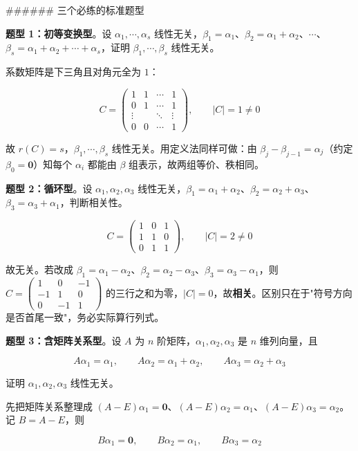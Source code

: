 \documentclass[11pt,openany,UTF8]{ctexbook}
\begin{document}
\#\#\#\#\#\# 三个必练的标准题型

\textbf{题型 1：初等变换型}。设 $\alpha_1,\cdots,\alpha_s$ 线性无关，$\beta_1=\alpha_1$、$\beta_2=\alpha_1+\alpha_2$、$\cdots$、$\beta_s=\alpha_1+\alpha_2+\cdots+\alpha_s$，证明 $\beta_1,\cdots,\beta_s$ 线性无关。

系数矩阵是下三角且对角元全为 $1$：

\[C=\begin{pmatrix} 1 & 1 & \cdots & 1 \\ 0 & 1 & \cdots & 1 \\ \vdots & & \ddots & \vdots \\ 0 & 0 & \cdots & 1 \end{pmatrix},\qquad \vert C\vert=1\ne0\]

故 $r(C)=s$，$\beta_1,\cdots,\beta_s$ 线性无关。用定义法同样可做：由 $\beta_j-\beta_{j-1}=\alpha_j$（约定 $\beta_0=\mathbf{0}$）知每个 $\alpha_i$ 都能由 $\beta$ 组表示，故两组等价、秩相同。

\textbf{题型 2：循环型}。设 $\alpha_1,\alpha_2,\alpha_3$ 线性无关，$\beta_1=\alpha_1+\alpha_2$、$\beta_2=\alpha_2+\alpha_3$、$\beta_3=\alpha_3+\alpha_1$，判断相关性。

\[C=\begin{pmatrix} 1 & 0 & 1 \\ 1 & 1 & 0 \\ 0 & 1 & 1 \end{pmatrix},\qquad \vert C\vert=2\ne0\]

故无关。若改成 $\beta_1=\alpha_1-\alpha_2$、$\beta_2=\alpha_2-\alpha_3$、$\beta_3=\alpha_3-\alpha_1$，则 $C=\begin{pmatrix} 1 & 0 & -1 \\ -1 & 1 & 0 \\ 0 & -1 & 1 \end{pmatrix}$ 的三行之和为零，$\vert C\vert=0$，故\textbf{相关}。区别只在于"符号方向是否首尾一致"，务必实际算行列式。

\textbf{题型 3：含矩阵关系型}。设 $A$ 为 $n$ 阶矩阵，$\alpha_1,\alpha_2,\alpha_3$ 是 $n$ 维列向量，且

\[A\alpha_1=\alpha_1,\qquad A\alpha_2=\alpha_1+\alpha_2,\qquad A\alpha_3=\alpha_2+\alpha_3\]

证明 $\alpha_1,\alpha_2,\alpha_3$ 线性无关。

先把矩阵关系整理成 $(A-E)\alpha_1=\mathbf{0}$、$(A-E)\alpha_2=\alpha_1$、$(A-E)\alpha_3=\alpha_2$。记 $B=A-E$，则

\[B\alpha_1=\mathbf{0},\qquad B\alpha_2=\alpha_1,\qquad B\alpha_3=\alpha_2\]
\end{document}
